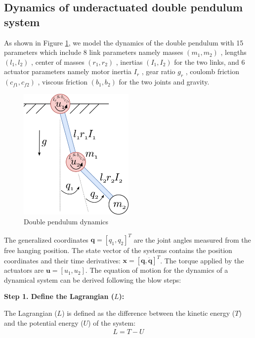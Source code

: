 \subsection{Dynamics of underactuated double pendulum system}
As shown in Figure \ref{fig:double pendulum dynamics}, we model the dynamics of the double pendulum with 15 parameters which include 8 link parameters namely masses \((m_1,m_2)\)
, lengths \((l_1,l_2)\)
, center of masses \((r_1,r_2)\) 
, inertias \((I_1,I_2)\)
 for the two links, and 6 actuator parameters namely motor inertia \(I_r\)
, gear ratio \(g_r\)
, coulomb friction \((c_{f1},c_{f2})\)
, viscous friction \((b_1,b_2)\)
 for the two joints and gravity.
\begin{figure}[h]
  \centering
  \includegraphics[width=0.5\textwidth]{figures/double_pendulum_dynamics.png} %
  \caption{Double pendulum dynamics}
  \label{fig:double pendulum dynamics}
\end{figure}

The generalized coordinates \( \mathbf{q} =[q_1,q_2]^T \) are the joint angles measured from the free hanging position. The state vector of the systems contains the position coordinates and their time derivatives: \(\mathbf{x}=[\mathbf{q},\mathbf{\dot{q}}]^T\). The torque applied by the actuators are \(\mathbf{u}=[u_1,u_2]\). The equation of motion for the dynamics of a dynamical system can be derived following the blow steps:

\textbf{Step 1. Define the Lagrangian (\(L\)):}

   The Lagrangian (\(L\)) is defined as the difference between the kinetic energy (\(T\)) and the potential energy (\(U\)) of the system:
   \begin{align}
         L = T - U
   \end{align}


